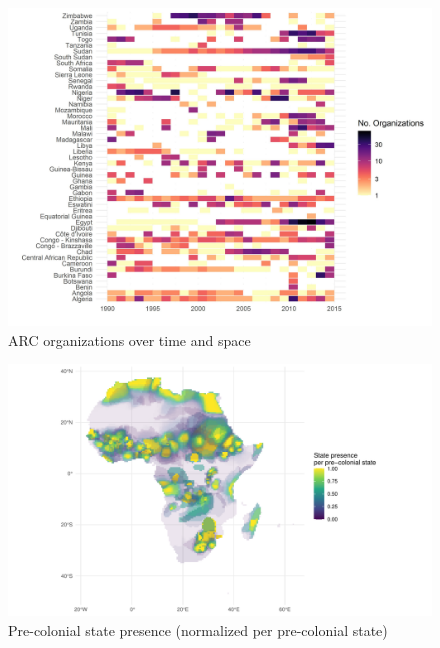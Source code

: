 \documentclass{beamer}
\begin{document}

\begin{frame} %
	\begin{figure}
		\includegraphics[width=.9\textwidth]{img/figure_2_revised.jpg}
		\caption{ARC organizations over time and space}
	\end{figure}
\end{frame}

\begin{frame} %
	\begin{figure}
		\includegraphics[width=\textwidth]{img/geo_isd_all.pdf}
		\caption{Pre-colonial state presence (normalized per pre-colonial state)}
	\end{figure}
\end{frame}
\end{document}
